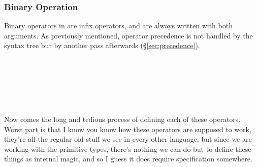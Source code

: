 \subsubsection{Binary Operation}
\label{sec:binop}

Binary operators in \Poetry{} are infix operators, and are always written
with both arguments. As previously mentioned, operator precedence is not
handled by the syntax tree but by another pass afterwards (\S\ref{sec:precedence}).

\begin{bnf*}
     \\
     \\
    \bnfmore{
        \bnfts{\op{==}}
        \bnfor
        \bnfts{\op{===}}
        \bnfor
        \bnfts{\op{<}}
        \bnfor
        \bnfts{\op{>}}
        \bnfor
        \bnfts{\op{>=}}
        \bnfor
        \bnfts{\op{<=}}
        \bnfor
    } \\
    \bnfmore{
        \bnfts{\op{\&}}
        \bnfor
        \bnfts{\op{|}}
        \bnfor
        \bnfts{\op{\textasciicircum}}
        \bnfor
        \bnfts{\op{<\textasciitilde}}
        \bnfor
        \bnfts{\op{\textasciitilde>}}
        \bnfor
        \bnfts{\op{,}}
        \bnfor
        \bnfts{\op{:}}
        \bnfor
    } \\
    \bnfmore{
        \bnfts{\op{<>}}
        \bnfor
        \bnfts{\op{>>}}
        \bnfor
        \bnfts{\op{<<}}
        \bnfor
        \bnfts{\op{|>}}
        \bnfor
        \bnfts{\op{<|}}
    } \\
\end{bnf*}

Now comes the long and tedious process of defining each of these operators.
Worst part is that I know you know how these operators are supposed to work,
they're all the regular old stuff we see in every other language, but since
we are working with the primitive types, there's nothing we can do but to
define these things as internal magic, and so I guess it does require
specification somewhere.

